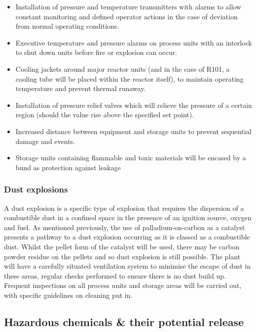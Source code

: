 \begin{itemize}
\item Installation of pressure and temperature transmitters with alarms to allow constant monitoring and defined operator actions in the case of deviation from normal operating conditions.
         \item Executive temperature and pressure alarms on process units with an interlock to shut down units before fire or explosion can occur. 
         \item Cooling jackets around major reactor units (and in the case of R101, a cooling tube will be placed within the reactor itself), to maintain operating temperature and prevent thermal runaway.
          \item Installation of pressure relief valves which will relieve the pressure of a certain region (should the value rise above the specified set point).
    \item Increased distance between equipment and storage units to prevent sequential damage and events.
    \item Storage units containing flammable and toxic materials will be encased by a bund as protection against leakage
\end{itemize}


\subsubsection{Dust explosions}

A dust explosion is a specific type of explosion that requires the dispersion of a combustible dust in a confined space in the presence of an ignition source, oxygen and fuel. As mentioned previously, the use of palladium-on-carbon as a catalyst presents a pathway to a dust explosion occurring as it is classed as a combustible dust. Whilst the pellet form of the catalyst will be used, there may be carbon powder residue on the pellets and so dust explosion is still possible. The plant will have a carefully situated ventilation system to minimise the escape of dust in these areas, regular checks performed to ensure there is no dust build up.
Frequent inspections on all process units and storage areas will be carried out, with specific guidelines on cleaning put in. 

\subsection{Hazardous chemicals \& their potential release}

